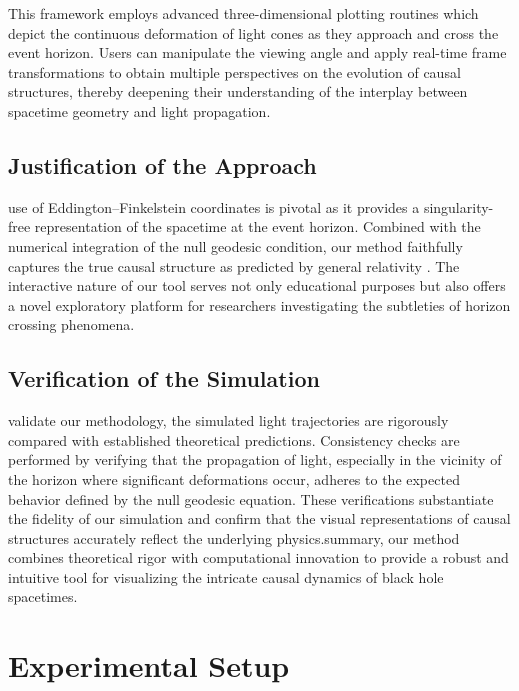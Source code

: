 \documentclass{article}
\begin{document}
This framework employs advanced three-dimensional plotting routines which depict the continuous deformation of light cones as they approach and cross the event horizon. Users can manipulate the viewing angle and apply real-time frame transformations to obtain multiple perspectives on the evolution of causal structures, thereby deepening their understanding of the interplay between spacetime geometry and light propagation.\n\n\subsection{Justification of the Approach}\nThe use of Eddington--Finkelstein coordinates is pivotal as it provides a singularity-free representation of the spacetime at the event horizon. Combined with the numerical integration of the null geodesic condition, our method faithfully captures the true causal structure as predicted by general relativity \cite{ref1, ref2}. The interactive nature of our tool serves not only educational purposes but also offers a novel exploratory platform for researchers investigating the subtleties of horizon crossing phenomena.\n\n\subsection{Verification of the Simulation}\nTo validate our methodology, the simulated light trajectories are rigorously compared with established theoretical predictions. Consistency checks are performed by verifying that the propagation of light, especially in the vicinity of the horizon where significant deformations occur, adheres to the expected behavior defined by the null geodesic equation. These verifications substantiate the fidelity of our simulation and confirm that the visual representations of causal structures accurately reflect the underlying physics.\n\nIn summary, our method combines theoretical rigor with computational innovation to provide a robust and intuitive tool for visualizing the intricate causal dynamics of black hole spacetimes.\section{Experimental Setup}
\end{document}
